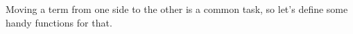 {{{{{{\begin{code}
\AgdaSpace{}%
\AgdaSpace{}%
%
\>[20]\AgdaSpace{}%
\AgdaSymbol{(}\AgdaSpace{}%
\AgdaSymbol{(}\AgdaOperator{\AgdaFunction{!}}\AgdaSpace{}%
\AgdaSymbol{)}\AgdaSpace{}%
\AgdaSymbol{\AgdaUnderscore{}}\AgdaSpace{}%
\AgdaSymbol{\AgdaUnderscore{})}\AgdaSpace{}%
\<%
\\
%
\>[6]\AgdaOperator{\AgdaFunction{!}}\AgdaSpace{}%
\AgdaSpace{}%
\AgdaSpace{}%
\AgdaSymbol{(}\AgdaSpace{}%
\AgdaSpace{}%
\AgdaSymbol{)}\AgdaSpace{}%
\AgdaSpace{}%
\AgdaSymbol{(}\AgdaSpace{}%
\AgdaSymbol{(}\AgdaOperator{\AgdaFunction{!}}\AgdaSpace{}%
\AgdaSpace{}%
\AgdaSymbol{)}\AgdaSpace{}%
\AgdaSymbol{)}\AgdaSpace{}%
\<%
\\
%
\>[6]\AgdaOperator{\AgdaFunction{!}}\AgdaSpace{}%
\AgdaSpace{}%
\AgdaSpace{}%
%
\>[20]\AgdaSpace{}%
\AgdaSpace{}%
\AgdaSpace{}%
\<%
\\
%
\>[6]\AgdaSpace{}%
\<%
\\
%
\>[4]\<%
\end{code}

Moving a term from one side to the other is a common task,
so let's define some handy functions for that.

}}}}}}
